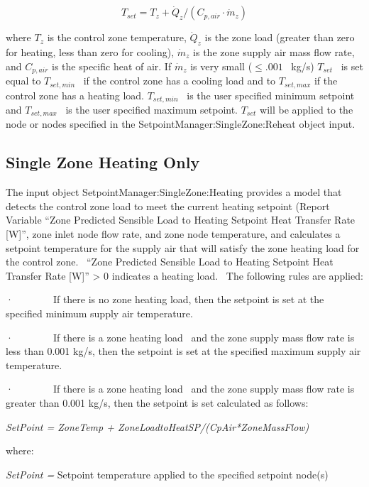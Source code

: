 \begin{equation}
{T_{set}} = {T_z} + {\dot Q_z}/({C_{p,air}}\cdot {\dot m_z})
\end{equation}

where \({T_z}\) is the control zone temperature, \({\dot Q_z}\) is the zone load (greater than zero for heating, less than zero for cooling), \({\dot m_z}\) is the zone supply air mass flow rate, and \({C_{p,air}}\) is the specific heat of air. If \({\dot m_z}\) is very small (\(\le .001\) ~kg/s) \({T_{set}}\) ~is set equal to \({T_{set,min}}\) ~if the control zone has a cooling load and to \({T_{set,max}}\) if the control zone has a heating load. \({T_{set,min}}\) ~is the user specified minimum setpoint and \({T_{set,max}}\) ~is the user specified maximum setpoint. \({T_{set}}\) will be applied to the node or nodes specified in the SetpointManager:SingleZone:Reheat object input.

\subsection{Single Zone Heating Only}\label{single-zone-heating-only}

The input object SetpointManager:SingleZone:Heating provides a model that detects the control zone load to meet the current heating setpoint (Report Variable ``Zone Predicted Sensible Load to Heating Setpoint Heat Transfer Rate {[}W{]}'', zone inlet node flow rate, and zone node temperature, and calculates a setpoint temperature for the supply air that will satisfy the zone heating load for the control zone.~ ``Zone Predicted Sensible Load to Heating Setpoint Heat Transfer Rate {[}W{]}'' \textgreater{} 0 indicates a heating load.~ The following rules are applied:

·~~~~~~~~If there is no zone heating load, then the setpoint is set at the specified minimum supply air temperature.

·~~~~~~~~If there is a zone heating load~ and the zone supply mass flow rate is less than 0.001 kg/s, then the setpoint is set at the specified maximum supply air temperature.

·~~~~~~~~If there is a zone heating load~ and the zone supply mass flow rate is greater than 0.001 kg/s, then the setpoint is set calculated as follows:

\emph{SetPoint = ZoneTemp + ZoneLoadtoHeatSP/(CpAir*ZoneMassFlow)}

where:

\emph{SetPoint =} Setpoint temperature applied to the specified setpoint node(s)


